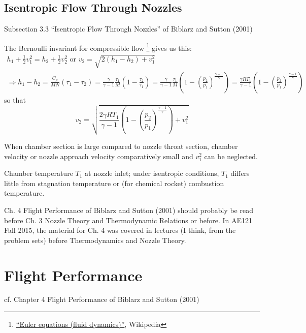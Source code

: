 \documentclass[10pt]{amsart}
\begin{document}
\begin{multicols*}{2}
\subsection{Isentropic Flow Through Nozzles}

Subsection 3.3 ``Isentropic Flow Through Nozzles'' of Biblarz and Sutton (2001) \cite{GSuttonOBiblarz2001} 

The Bernoulli invariant for compressible flow \footnote{\href{https://en.wikipedia.org/wiki/Euler_equations_\%28fluid_dynamics\%29\#Compressible_case}{``Euler equations (fluid dynamics)''}, Wikipedia} gives us this:
\[
\begin{gathered}
  h_1 + \frac{1}{2} v_1^2 = h_2 + \frac{1}{2} v_2^2 \text{ or } v_2 = \sqrt{ 2 (h_1 - h_2) + v_1^2 } \\
\Longrightarrow h_1 - h_2 = \frac{C_p}{MN}(\tau_1 - \tau_2) = \frac{ \gamma}{ \gamma -1} \frac{\tau_1}{M} \left( 1 - \frac{\tau_2}{\tau_1} \right) = \frac{ \gamma}{\gamma-1} \frac{\tau_1}{M} \left( 1 - \left( \frac{p_2}{p_1} \right)^{\frac{\gamma-1}{\gamma} } \right) = \frac{\gamma RT_1}{ \gamma -1} (1 - \left( \frac{p_2}{p_1} \right)^{\frac{\gamma-1}{\gamma } } )
\end{gathered}
\]
so that 
\[
v_2  = \sqrt{ \frac{2\gamma RT_1}{\gamma -1} \left(1- \left( \frac{p_2}{p_1} \right)^{\frac{\gamma-1}{\gamma} } \right) + v_1^2}
\]

When chamber section is large compared to nozzle throat section, chamber velocity or nozzle approach velocity comparatively small and $v_1^2$ can be neglected.\cite{GSuttonOBiblarz2001}

Chamber temperature $T_1$ at nozzle inlet; under isentropic conditions, $T_1$ differs little from stagnation temperature or (for chemical rocket) combustion temperature.\cite{GSuttonOBiblarz2001}

  

Ch. 4 Flight Performance of Biblarz and Sutton (2001) \cite{GSuttonOBiblarz2001} should probably be read before Ch. 3 Nozzle Theory and Thermodynamic Relations or before.  In AE121 Fall 2015, the material for Ch. 4 was covered in lectures (I think, from the problem sets) before Thermodynamics and Nozzle Theory.  

\cite{GSuttonOBiblarz2001}

\section{Flight Performance}

cf. Chapter 4 Flight Performance of Biblarz and Sutton (2001) \cite{GSuttonOBiblarz2001} 


\end{multicols*}
\end{document}
